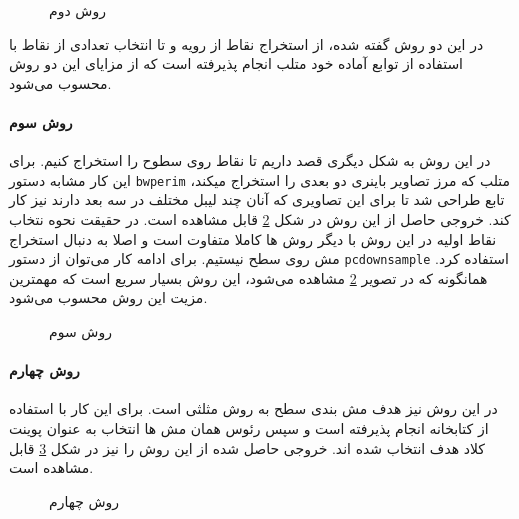 \begin{figure}[t!]
	\centering
	\removevspace
	\caption{روش دوم}
	\label{fig:partA:Q2:method2-isosurface}
\end{figure}



\begin{note}
	در این دو روش گفته شده، از استخراج نقاط از رویه و تا انتخاب تعدادی از نقاط با استفاده از توابع آماده خود متلب انجام پذیرفته است که از مزایای این دو روش محسوب می‌شود.
\end{note}


\paragraph{روش سوم}

در این روش به شکل دیگری قصد داریم تا نقاط روی سطوح را استخراج کنیم. برای این کار مشابه دستور \texttt{bwperim} متلب که مرز تصاویر باینری دو بعدی را استخراج میکند، تابع  طراحی شد تا برای این تصاویری که آنان چند لیبل مختلف در سه بعد دارند نیز کار کند. خروجی حاصل از این روش در شکل \ref{fig:partA:Q2:method3-bwperim3}
قابل مشاهده است. در حقیقت نحوه نتخاب نقاط اولیه در این روش با دیگر روش ها کاملا متفاوت است و اصلا به دنبال استخراج مش روی سطح نیستیم. برای ادامه کار می‌توان از دستور \texttt{pcdownsample} استفاده کرد. همانگونه که در تصویر \ref{fig:partA:Q2:method3-bwperim3} مشاهده می‌شود، این روش بسیار سریع است که مهمترین مزیت این روش محسوب می‌شود.

\begin{figure}[t!]
	\centering
	\removevspace
	\caption{روش سوم}
	\label{fig:partA:Q2:method3-bwperim3}
\end{figure}

\paragraph{روش چهارم}


در این روش نیز هدف مش بندی سطح به روش مثلثی است. برای این کار با استفاده از کتابخانه
\cite{iso2mesh}
انجام پذیرفته است و سپس  رئوس همان مش ها انتخاب به عنوان پوینت کلاد هدف انتخاب شده اند. خروجی حاصل شده از این روش را نیز در شکل 
\ref{fig:partA:Q2:method4-iso2mesh}
قابل مشاهده است.


\begin{figure}[t!]
	\centering
	\removevspace
	\caption{روش چهارم}
	\label{fig:partA:Q2:method4-iso2mesh}
\end{figure}


